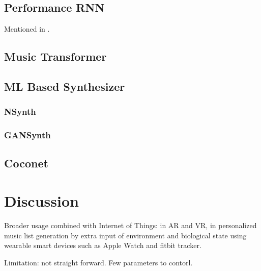 \documentclass[man]{apa6}
\begin{document}
\subsection{Performance RNN}
Mentioned in \textcite{performance-rnn-2017}.\lipsum[5]

\subsection{Music Transformer}
\lipsum[6]

\subsection{ML Based Synthesizer}
\lipsum[8]

\subsubsection{NSynth}
\lipsum[2]

\subsubsection{GANSynth}
\lipsum[9]

\subsection{Coconet}
\lipsum[10]

\section{Discussion}

Broader usage combined with Internet of Things: in AR and VR, in personalized music list generation by extra input of environment and biological state using wearable smart devices such as Apple Watch and fitbit tracker.

Limitation: not straight forward. Few parameters to contorl.

\lipsum[11]

\printbibliography
\end{document}

